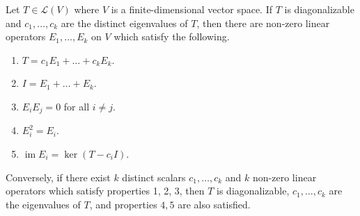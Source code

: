 \documentclass[11pt]{article}
\newcommand{\alg}[1]{\mathscr{#1}}
\newcommand{\algL}{\alg{L}}
\renewcommand{\ker}{\operatorname{ker}}
\newcommand{\im}{\operatorname{im}}
\theoremstyle{definition}
\theoremstyle{remark}
\numberwithin{equation}{section}
\begin{document}
    \begin{theorem}
        Let $T\in\algL(V)$ where $V$ is a finite-dimensional vector space. If $T$ is
        diagonalizable and $c_1, \dots, c_k$ are the distinct eigenvalues of $T$,
        then there are non-zero linear operators $E_1, \dots, E_k$ on $V$ which
        satisfy the following.
        \begin{enumerate}
            \itemsep0em
            \item $T = c_1E_1 + \dots + c_kE_k$.
            \item $I = E_1 + \dots + E_k$.
            \item $E_iE_j = 0$ for all $i \neq j$.
            \item $E_i^2 = E_i$.
            \item $\im{E_i} = \ker(T - c_iI)$.
        \end{enumerate}
        Conversely, if there exist $k$ distinct scalars $c_1, \dots, c_k$ and $k$
        non-zero linear operators which satisfy properties 1, 2, 3, then $T$ is
        diagonalizable, $c_1, \dots, c_k$ are the eigenvalues of $T$, and properties
        $4, 5$ are also satisfied.
    \end{theorem}
\end{document}
